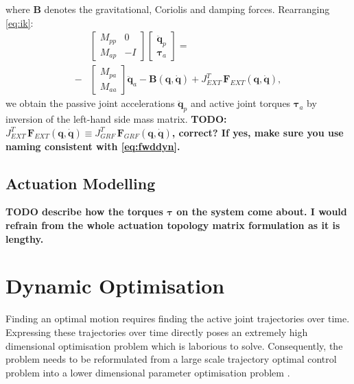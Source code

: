 \documentclass[letterpaper, 10 pt, conference]{ieeeconf}  %
\begin{document}
where $\mathbf{B}$ denotes the gravitational, Coriolis and damping forces. 
Rearranging \eqref{eq:ik}:
\begin{equation}
\begin{aligned}
&\left[\begin{array}{cc}  
M_{pp} & 0\\
M_{ap} &-I
\end{array} \right]
\left[\begin{array}{c}  
\mathbf{\ddot q}_p\\
\boldsymbol{\tau}_a
\end{array} \right] =\\ 
-&
\left[\begin{array}{c}  
M_{pa}\\
M_{aa}
\end{array} \right] 
\mathbf{\ddot q}_a-
\mathbf{B(q, \dot q)}+
J_{EXT}^T \, \mathbf{F}_{EXT}\mathbf{(q, \dot q)},
\end{aligned}
\end{equation}	
we obtain the passive joint accelerations $\mathbf{\ddot q}_p$ and active joint torques $\boldsymbol{\tau}_a$ by inversion of the left-hand side mass matrix. \textbf{TODO: $J_{EXT}^T \, \mathbf{F}_{EXT}\mathbf{(q, \dot q)} \equiv J_{GRF}^T \, \mathbf{F}_{GRF}\mathbf{(q, \dot q)}$, correct? If yes, make sure you use naming consistent with \eqref{eq:fwddyn}.}


\subsection{Actuation Modelling}
\label{subsec:actuationModel}
\textbf{TODO describe how the torques $\boldsymbol{\tau}$ on the system come about. I would refrain from the whole actuation topology matrix formulation as it is lengthy.}


\section{Dynamic Optimisation} \label{sec:dynamicOptimisation}
Finding an optimal motion requires finding the active joint trajectories over time. Expressing these trajectories over time directly poses an extremely high dimensional optimisation problem which is laborious to solve. Consequently, the problem needs to be reformulated from a large scale trajectory optimal control problem into a lower dimensional parameter optimisation problem \cite{kaphle2008optimality}.
\end{document}
